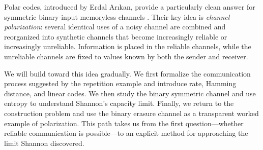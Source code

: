 Polar codes, introduced by Erdal Arıkan, provide a particularly clean answer for symmetric binary-input memoryless channels \cite{Arikan2009}. Their key idea is \emph{channel polarization}: several identical uses of a noisy channel are combined and reorganized into synthetic channels that become increasingly reliable or increasingly unreliable. Information is placed in the reliable channels, while the unreliable channels are fixed to values known by both the sender and receiver.

We will build toward this idea gradually. We first formalize the communication process suggested by the repetition example and introduce rate, Hamming distance, and linear codes. We then study the binary symmetric channel and use entropy to understand Shannon's capacity limit. Finally, we return to the construction problem and use the binary erasure channel as a transparent worked example of polarization. This path takes us from the first question---whether reliable communication is possible---to an explicit method for approaching the limit Shannon discovered.

